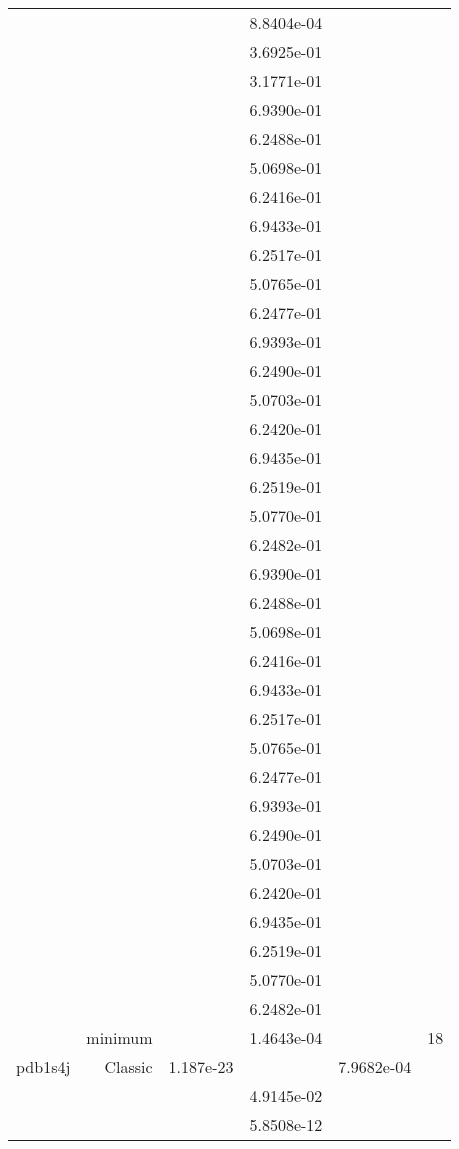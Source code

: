 \begin{xltabular}{\textwidth}{r|rS[table-format=1.3e+2]S[table-format=1.4e+2]S[table-format=1.4e+2]S[table-format=-1.5]}
&  &  & 8.8404e-04 & & \\
&  &  & 3.6925e-01 & & \\
&  &  & 3.1771e-01 & & \\
&  &  & 6.9390e-01 & & \\
&  &  & 6.2488e-01 & & \\
&  &  & 5.0698e-01 & & \\
&  &  & 6.2416e-01 & & \\
&  &  & 6.9433e-01 & & \\
&  &  & 6.2517e-01 & & \\
&  &  & 5.0765e-01 & & \\
&  &  & 6.2477e-01 & & \\
&  &  & 6.9393e-01 & & \\
&  &  & 6.2490e-01 & & \\
&  &  & 5.0703e-01 & & \\
&  &  & 6.2420e-01 & & \\
&  &  & 6.9435e-01 & & \\
&  &  & 6.2519e-01 & & \\
&  &  & 5.0770e-01 & & \\
&  &  & 6.2482e-01 & & \\
&  &  & 6.9390e-01 & & \\
&  &  & 6.2488e-01 & & \\
&  &  & 5.0698e-01 & & \\
&  &  & 6.2416e-01 & & \\
&  &  & 6.9433e-01 & & \\
&  &  & 6.2517e-01 & & \\
&  &  & 5.0765e-01 & & \\
&  &  & 6.2477e-01 & & \\
&  &  & 6.9393e-01 & & \\
&  &  & 6.2490e-01 & & \\
&  &  & 5.0703e-01 & & \\
&  &  & 6.2420e-01 & & \\
&  &  & 6.9435e-01 & & \\
&  &  & 6.2519e-01 & & \\
&  &  & 5.0770e-01 & & \\
&  &  & 6.2482e-01 & & \\
& minimum &  & 1.4643e-04 & & 18 \\  \addlinespace
pdb1s4j & Classic & 1.187e-23 &  & 7.9682e-04 & \\
&  &  & 4.9145e-02 & & \\
&  &  & 5.8508e-12 & & \\

\end{xltabular}
